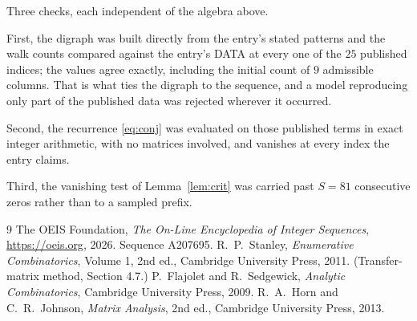 \documentclass[11pt,a4paper]{article}
\theoremstyle{plain}
\theoremstyle{definition}
\begin{document}
Three checks, each independent of the algebra above.

First, the digraph was built directly from the entry's stated patterns and the walk counts
compared against the entry's DATA at every one of the $25$ published indices; the
values agree exactly, including the initial count of $9$ admissible columns. That is
what ties the digraph to the sequence, and a model reproducing only part of the published
data was rejected wherever it occurred.

Second, the recurrence \eqref{eq:conj} was evaluated on those published terms in exact
integer arithmetic, with no matrices involved, and vanishes at every index the entry claims.

Third, the vanishing test of Lemma~\ref{lem:crit} was carried past $S=81$ consecutive
zeros rather than to a sampled prefix.

\begin{thebibliography}{9}
 The OEIS Foundation, \emph{The On-Line Encyclopedia of Integer
Sequences}, \url{https://oeis.org}, 2026. Sequence A207695.
 R.~P.~Stanley, \emph{Enumerative Combinatorics}, Volume 1, 2nd ed.,
Cambridge University Press, 2011. (Transfer-matrix method, Section 4.7.)
 P.~Flajolet and R.~Sedgewick, \emph{Analytic Combinatorics}, Cambridge
University Press, 2009.
 R.~A.~Horn and C.~R.~Johnson, \emph{Matrix Analysis}, 2nd ed., Cambridge
University Press, 2013.
\end{thebibliography}
\end{document}
